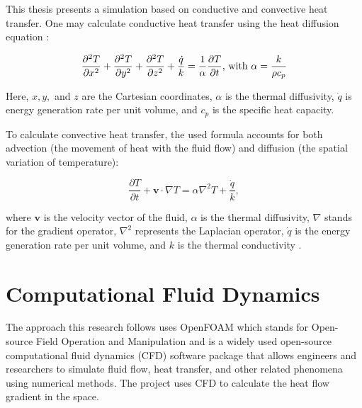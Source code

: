 This thesis presents a simulation based on conductive and convective heat transfer. 
One may calculate conductive heat transfer using the heat diffusion equation \cite{bergman2011fundamentals}:
	
	\begin{equation} 
	\frac{\partial^2 T}{\partial x^2}+
	\frac{\partial^2 T}{\partial y^2}+
	\frac{\partial^2 T}{\partial z^2}+ 
	\frac{\dot{q}}{k}= \frac{1}{\alpha}\frac{\partial T}{\partial t} \text{, with } \alpha = \frac{k}{\rho c_p}\quad \\
	\end{equation}
	
	
Here, $x,y,$ and $z$ are the Cartesian coordinates, $\alpha$ is the thermal diffusivity, $\dot{q}$ is energy generation rate per unit volume, and $c_p$ is the specific heat capacity.
 
To calculate convective heat transfer, the used formula accounts for both advection (the movement of heat with the fluid flow) and diffusion (the spatial variation of temperature): 

\begin{equation}
    \frac{\partial T}{\partial t} + \mathbf{v} \cdot \nabla T = \alpha \nabla^2 T + \frac{\dot{q}}{k},
\end{equation}

where $\mathbf{v}$ is the velocity vector of the fluid, $\alpha$ is the thermal diffusivity, $\nabla$ stands for the gradient operator, $\nabla^2$ represents the Laplacian operator, $\dot{q}$ is the energy generation rate per unit volume, and $k$ is the thermal conductivity \cite{bergman2011fundamentals}.











\section{Computational Fluid Dynamics}
The approach this research follows uses OpenFOAM which stands for Open-source Field Operation and Manipulation and is a widely used open-source computational fluid dynamics  (CFD) software package that allows engineers and researchers to simulate fluid flow, heat transfer, and other related phenomena using numerical methods. The project uses CFD to calculate the heat flow gradient in the space.

